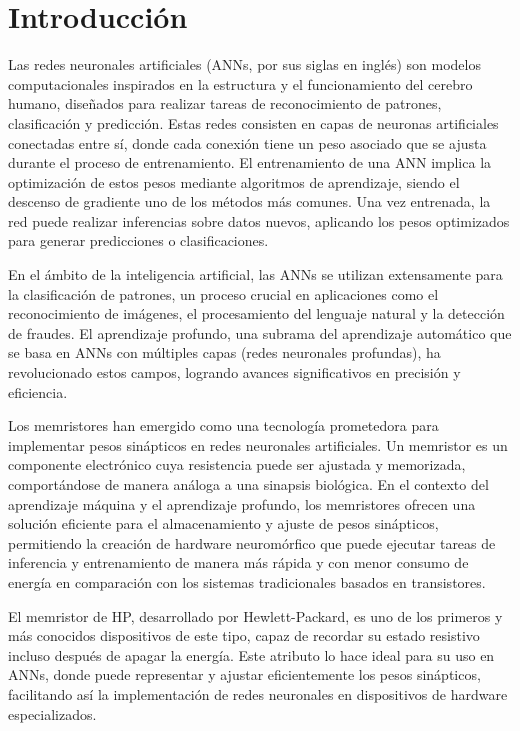 \documentclass[conference]{IEEEtran}
\begin{document}
\section{Introducción}
Las redes neuronales artificiales (ANNs, por sus siglas en inglés) son modelos computacionales inspirados en la estructura y el funcionamiento del cerebro humano, diseñados para realizar tareas de reconocimiento de patrones, clasificación y predicción. Estas redes consisten en capas de neuronas artificiales conectadas entre sí, donde cada conexión tiene un peso asociado que se ajusta durante el proceso de entrenamiento. El entrenamiento de una ANN implica la optimización de estos pesos mediante algoritmos de aprendizaje, siendo el descenso de gradiente uno de los métodos más comunes. Una vez entrenada, la red puede realizar inferencias sobre datos nuevos, aplicando los pesos optimizados para generar predicciones o clasificaciones.

En el ámbito de la inteligencia artificial, las ANNs se utilizan extensamente para la clasificación de patrones, un proceso crucial en aplicaciones como el reconocimiento de imágenes, el procesamiento del lenguaje natural y la detección de fraudes. El aprendizaje profundo, una subrama del aprendizaje automático que se basa en ANNs con múltiples capas (redes neuronales profundas), ha revolucionado estos campos, logrando avances significativos en precisión y eficiencia.

Los memristores han emergido como una tecnología prometedora para implementar pesos sinápticos en redes neuronales artificiales. Un memristor es un componente electrónico cuya resistencia puede ser ajustada y memorizada, comportándose de manera análoga a una sinapsis biológica. En el contexto del aprendizaje máquina y el aprendizaje profundo, los memristores ofrecen una solución eficiente para el almacenamiento y ajuste de pesos sinápticos, permitiendo la creación de hardware neuromórfico que puede ejecutar tareas de inferencia y entrenamiento de manera más rápida y con menor consumo de energía en comparación con los sistemas tradicionales basados en transistores.

El memristor de HP, desarrollado por Hewlett-Packard, es uno de los primeros y más conocidos dispositivos de este tipo, capaz de recordar su estado resistivo incluso después de apagar la energía. Este atributo lo hace ideal para su uso en ANNs, donde puede representar y ajustar eficientemente los pesos sinápticos, facilitando así la implementación de redes neuronales en dispositivos de hardware especializados.
\end{document}
